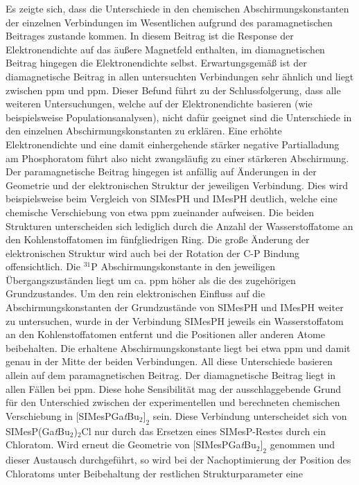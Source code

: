 Es zeigte sich, dass die Unterschiede in den chemischen Abschirmungskonstanten der einzelnen Verbindungen im Wesentlichen aufgrund des paramagnetischen Beitrages zustande kommen. In diesem Beitrag ist die Response der Elektronendichte auf das äußere Magnetfeld enthalten, im diamagnetischen Beitrag hingegen die Elektronendichte selbst. Erwartungsgemäß ist der diamagnetische Beitrag in allen untersuchten Verbindungen sehr ähnlich und liegt zwischen \unit[960]{ppm} und \unit[967]{ppm}. Dieser Befund führt zu der Schlussfolgerung, dass alle weiteren Untersuchungen, welche auf der Elektronendichte basieren (wie beispielsweise Populationsanalysen), nicht dafür geeignet sind die Unterschiede in den einzelnen Abschirmungskonstanten zu erklären. Eine erhöhte Elektronendichte und eine damit einhergehende stärker negative Partialladung am Phosphoratom führt also nicht zwangsläufig zu einer stärkeren Abschirmung. Der paramagnetische Beitrag hingegen ist anfällig auf Änderungen in der Geometrie und der elektronischen Struktur der jeweiligen Verbindung. Dies wird beispielsweise beim Vergleich von SIMesPH und IMesPH deutlich, welche eine chemische Verschiebung von etwa \unit[20]{ppm} zueinander aufweisen. Die beiden Strukturen unterscheiden sich lediglich durch die Anzahl der Wasserstoffatome an den Kohlenstoffatomen im fünfgliedrigen Ring. Die große Änderung der elektronischen Struktur wird auch bei der Rotation der C-P Bindung offensichtlich. Die $^{31}$P Abschirmungskonstante in den jeweiligen Übergangszuständen liegt um ca. \unit[60]{ppm} höher als die des zugehörigen Grundzustandes. Um den rein elektronischen Einfluss auf die Abschirmungskonstanten der Grundzustände von SIMesPH und IMesPH weiter zu untersuchen, wurde in der Verbindung SIMesPH jeweils ein Wasserstoffatom an den Kohlenstoffatomen entfernt und die Positionen aller anderen Atome beibehalten. Die erhaltene Abschirmungskonstante liegt bei etwa \unit[444]{ppm} und damit genau in der Mitte der beiden Verbindungen. All diese Unterschiede basieren allein auf dem paramagnetischen Beitrag. Der diamagnetische Beitrag liegt in allen Fällen bei \unit[962]{ppm}.
Diese hohe Sensibilität mag der ausschlaggebende Grund für den Unterschied zwischen der experimentellen und berechneten chemischen Verschiebung in $[$SIMesPGa\textit{t}Bu$_2]_2$ sein. Diese Verbindung unterscheidet sich von SIMesP(Ga\textit{t}Bu$_2$)$_2$Cl nur durch das Ersetzen eines SIMesP-Restes durch ein Chloratom. Wird erneut die Geometrie von $[$SIMesPGa\textit{t}Bu$_2]_2$ genommen und dieser Austausch durchgeführt, so wird bei der Nachoptimierung der Position des Chloratoms unter Beibehaltung der restlichen Strukturparameter eine 
